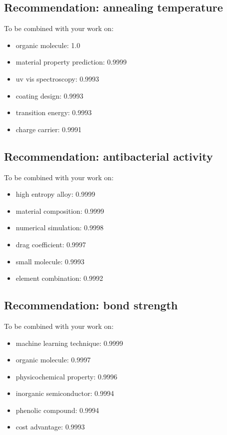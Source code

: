 \documentclass{article}%
\begin{document}
%
\subsection{Recommendation: annealing temperature}%
\label{subsec:Recommendationannealingtemperature}%
To be combined with your work on:%
\begin{itemize}%
\item%
organic molecule: 1.0%
\item%
material property prediction: 0.9999%
\item%
uv vis spectroscopy: 0.9993%
\item%
coating design: 0.9993%
\item%
transition energy: 0.9993%
\item%
charge carrier: 0.9991%
\end{itemize}

%
\subsection{Recommendation: antibacterial activity}%
\label{subsec:Recommendationantibacterialactivity}%
To be combined with your work on:%
\begin{itemize}%
\item%
high entropy alloy: 0.9999%
\item%
material composition: 0.9999%
\item%
numerical simulation: 0.9998%
\item%
drag coefficient: 0.9997%
\item%
small molecule: 0.9993%
\item%
element combination: 0.9992%
\end{itemize}

%
\subsection{Recommendation: bond strength}%
\label{subsec:Recommendationbondstrength}%
To be combined with your work on:%
\begin{itemize}%
\item%
machine learning technique: 0.9999%
\item%
organic molecule: 0.9997%
\item%
physicochemical property: 0.9996%
\item%
inorganic semiconductor: 0.9994%
\item%
phenolic compound: 0.9994%
\item%
cost advantage: 0.9993%
\end{itemize}
\end{document}
